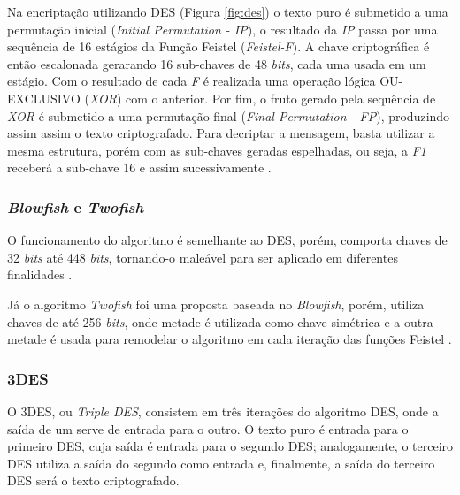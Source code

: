 \documentclass[12pt]{article}
\newcommand{\bits}{\textit{bits}\xspace}
\begin{document}
                Na encriptação utilizando DES (Figura \ref{fig:des}) o texto puro é submetido a uma permutação inicial (\textit{Initial Permutation - IP}), o resultado da \textit{IP} passa por uma sequência de 16 estágios da Função Feistel (\textit{Feistel-F}). A chave criptográfica é então escalonada gerarando 16 sub-chaves de 48 \bits, cada uma usada em um estágio. Com o resultado de cada \textit{F} é realizada uma operação lógica OU-EXCLUSIVO (\textit{XOR}) com o anterior. Por fim, o fruto gerado pela sequência de \textit{XOR} é submetido a uma permutação final (\textit{Final Permutation - FP}), produzindo assim assim o texto criptografado. Para decriptar a mensagem, basta utilizar a mesma estrutura, porém com as sub-chaves geradas espelhadas, ou seja, a \textit{F1} receberá a sub-chave 16 e assim sucessivamente \cite{standard1999des}.
                
                
            
            \subsubsection{\textit{Blowfish} e \textit{Twofish}}
            \label{subsubsec:blowfish}
            
                O funcionamento do algoritmo é semelhante ao DES, porém, comporta chaves de 32 \bits até 448 \bits, tornando-o maleável para ser aplicado em diferentes finalidades \cite{thakur2011blowfish}.
                
                Já o algoritmo \textit{Twofish} foi uma proposta baseada no \textit{Blowfish}, porém, utiliza chaves de até 256 \bits, onde metade é utilizada como chave simétrica e a outra metade é usada para remodelar o algoritmo em cada iteração das funções Feistel \cite{lucks2001twofish}.
                
            \subsubsection{3DES}
            \label{subsubsec:3DES}
            
                O 3DES, ou \textit{Triple DES}, consistem em três iterações do algoritmo DES, onde a saída de um serve de entrada para o outro. O texto puro é entrada para o primeiro DES, cuja saída é entrada para o segundo DES; analogamente, o terceiro DES utiliza a saída do segundo como entrada e, finalmente, a saída do terceiro DES será o texto criptografado.
            
\end{document}
